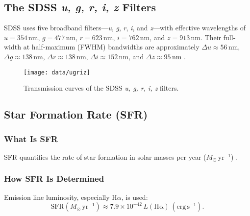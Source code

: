 \documentclass[english,bachelor,oneside]{ctufit-thesis}
\begin{document}
\subsection{The SDSS \textit{u, g, r, i, z} Filters}
SDSS uses five broadband filters—\textit{u}, \textit{g}, \textit{r}, \textit{i}, and \textit{z}—with effective wavelengths of 
$u = 354\,$nm, $g = 477\,$nm, $r = 623\,$nm, $i = 762\,$nm, and $z = 913\,$nm.  
Their full‐width at half‐maximum (FWHM) bandwidths are approximately  
$\Delta u \approx 56\,$nm, $\Delta g \approx 138\,$nm, $\Delta r \approx 138\,$nm,  
$\Delta i \approx 152\,$nm, and $\Delta z \approx 95\,$nm \cite{fukugita1996sloan}.  
\begin{figure}[H]
    \centering
    \texttt{[image: data/ugriz]}
    \caption{Transmission curves of the SDSS \textit{u, g, r, i, z} filters.}
    \label{fig:ugriz}
\end{figure}

\subsection{Star Formation Rate (SFR)}

\subsubsection{What Is SFR}
SFR quantifies the rate of star formation in solar masses per year ($M_{\odot}\,\mathrm{yr}^{-1}$) \cite{kennicutt1998star}.

\subsubsection{How SFR Is Determined}
Emission line luminosity, especially H$\alpha$, is used:
\[
  \mathrm{SFR}(M_{\odot}\,\mathrm{yr}^{-1}) \approx 7.9 \times 10^{-42}\, L(\mathrm{H\alpha})\,(\mathrm{erg\,s}^{-1}).
\]
\cite{kennicutt1998star}
\end{document}
